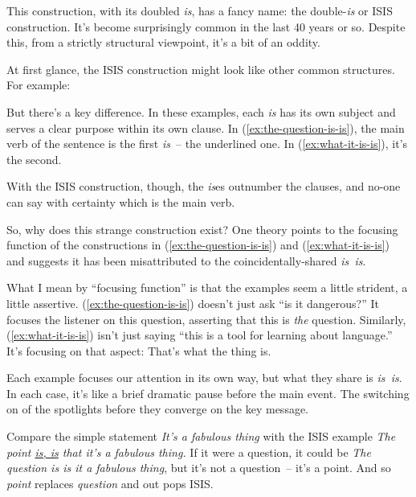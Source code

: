 This construction, with its doubled \textit{is}, has a fancy name: the double-\textit{is} or ISIS construction. It's become surprisingly common in the last 40 years or so. Despite this, from a strictly structural viewpoint, it's a bit of an oddity.

At first glance, the ISIS construction might look like other common structures. For example:

\ea
 \label{ex:the-question-is-is}
 \label{ex:what-it-is-is}
 \z
\z

But there's a key difference. In these examples, each \textit{is} has its own subject and serves a clear purpose within its own clause. In (\ref{ex:the-question-is-is}), the main verb of the sentence is the first \textit{is}~-- the underlined one. In (\ref{ex:what-it-is-is}), it's the second.

With the ISIS construction, though, the \textit{is}es outnumber the clauses, and no-one can say with certainty which is the main verb.

\bigskip

So, why does this strange construction exist? One theory points to the focusing function of the constructions in (\ref{ex:the-question-is-is}) and (\ref{ex:what-it-is-is}) and suggests it has been misattributed to the coincidentally-shared \textit{is~is}.

What I mean by \enquote{focusing function} is that the examples seem a little strident, a little assertive. (\ref{ex:the-question-is-is}) doesn't just ask \enquote{is it dangerous?} It focuses the listener on this question, asserting that this is \textit{the} question. Similarly, (\ref{ex:what-it-is-is}) isn't just saying \enquote{this is a tool for learning about language.} It's focusing on that aspect: That's what the thing is.

Each example focuses our attention in its own way, but what they share is \textit{is~is}. In each case, it's like a brief dramatic pause before the main event. The switching on of the spotlights before they converge on the key message.

Compare the simple statement \textit{It's a fabulous thing} with the ISIS example \textit{The point \uline{is, is} that it's a fabulous thing.} If it were a question, it could be \textit{The question is \ob is it a fabulous thing\cb}, but it's not a question~-- it's a point. And so \textit{point} replaces \textit{question} and out pops ISIS.

